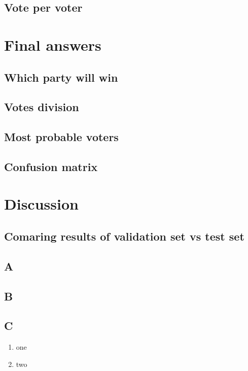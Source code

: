 \documentclass[12pt]{article}
\begin{document}
\subsection{Vote per voter}

\newpage
\section{Final answers}
\subsection{Which party will win}
\subsection{Votes division}
\subsection{Most probable voters}
\subsection{Confusion matrix}

\newpage
\section{Discussion}
\subsection{Comaring results of validation set vs test set}
\subsection{A}
\subsection{B}
\subsection{C}

\begin{enumerate}
	\item one
	\item two
\end{enumerate}
\end{document}
